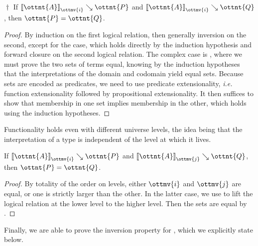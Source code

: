 \documentclass[a4paper,UKenglish,cleveref,autoref,thm-restate]{lipics-v2021}
\makeatletter
\newcommand{\ie}{\textit{i.e.}\@\xspace}
\makeatother
\begin{document}
\begin{lemma}[Functionality (l.r.)]$\!\!{\dagger}$ \label{lem:lr:func}
  If $ \mathopen{\llbracket}  \ottnt{A}  \mathclose{\rrbracket}_{ \ottmv{i} } \searrow  \ottnt{P} $ and $ \mathopen{\llbracket}  \ottnt{A}  \mathclose{\rrbracket}_{ \ottmv{i} } \searrow  \ottnt{Q} $, then $\ottnt{P} = \ottnt{Q}$.
\end{lemma}

\begin{proof}
  By induction on the first logical relation,
  then generally inversion on the second,
  except for the  case,
  which holds directly by the induction hypothesis
  and forward closure on the second logical relation.
  The complex case is ,
  where we must prove the two sets of terms equal,
  knowing by the induction hypotheses
  that the interpretations of the domain and codomain yield equal sets.
  Because sets are encoded as predicates,
  we need to use predicate extensionality,
  \ie function extensionality followed by propositional extensionality.
  It then suffices to show that membership in one set implies membership in the other,
  which holds using the induction hypotheses.
\end{proof}

Functionality holds even with different universe levels,
the idea being that the interpretation of a type is independent
of the level at which it lives.

\begin{lemma}
  If $ \mathopen{\llbracket}  \ottnt{A}  \mathclose{\rrbracket}_{ \ottmv{i} } \searrow  \ottnt{P} $ and $ \mathopen{\llbracket}  \ottnt{A}  \mathclose{\rrbracket}_{ \ottmv{j} } \searrow  \ottnt{Q} $, then $\ottnt{P} = \ottnt{Q}$.
\end{lemma}

\begin{proof}
  By totality of the order on levels,
  either $\ottmv{i}$ and $\ottmv{j}$ are equal,
  or one is strictly larger than the other.
  In the latter case,
  we use  to lift the logical relation at the lower level to the higher level.
  Then the sets are equal by .
\end{proof}

Finally, we are able to prove the inversion property for ,
which we explicitly state below.
\end{document}
